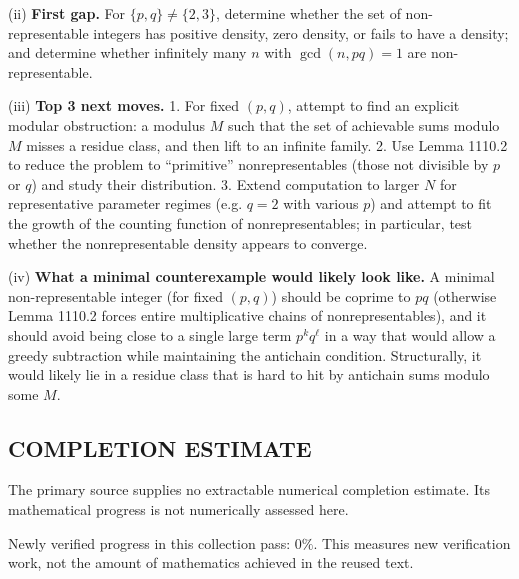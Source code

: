 (ii) \textbf{First gap.}
For $\{p,q\}\ne\{2,3\}$, determine whether the set of non-representable integers has positive density, zero density, or fails to have a density; and determine whether infinitely many $n$ with $\gcd(n,pq)=1$ are non-representable.

(iii) \textbf{Top 3 next moves.}
1. For fixed $(p,q)$, attempt to find an explicit modular obstruction: a modulus $M$ such that the set of achievable sums modulo $M$ misses a residue class, and then lift to an infinite family.
2. Use Lemma 1110.2 to reduce the problem to ``primitive'' nonrepresentables (those not divisible by $p$ or $q$) and study their distribution.
3. Extend computation to larger $N$ for representative parameter regimes (e.g. $q=2$ with various $p$) and attempt to fit the growth of the counting function of nonrepresentables; in particular, test whether the nonrepresentable density appears to converge.

(iv) \textbf{What a minimal counterexample would likely look like.}
A minimal non-representable integer (for fixed $(p,q)$) should be coprime to $pq$ (otherwise Lemma 1110.2 forces entire multiplicative chains of nonrepresentables), and it should avoid being close to a single large term $p^k q^\ell$ in a way that would allow a greedy subtraction while maintaining the antichain condition. Structurally, it would likely lie in a residue class that is hard to hit by antichain sums modulo some $M$.




\subsection*{COMPLETION ESTIMATE}
The primary source supplies no extractable numerical completion estimate. Its mathematical progress is not numerically assessed here.

Newly verified progress in this collection pass: $0\%$. This measures new verification work, not the amount of mathematics achieved in the reused text.
